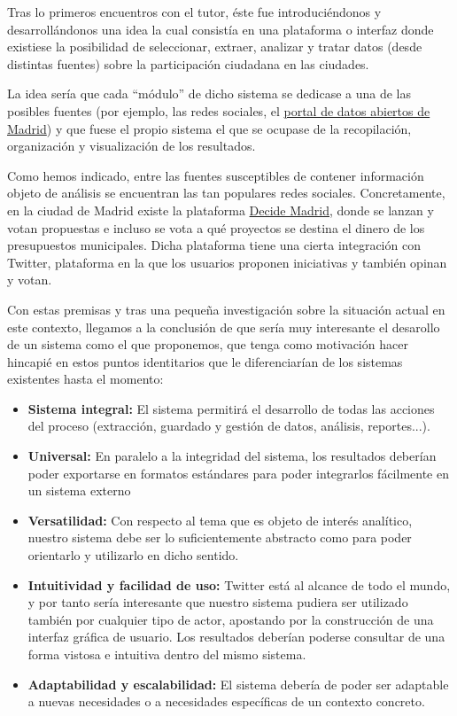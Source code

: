Tras lo primeros encuentros con el tutor, éste fue introduciéndonos y desarrollándonos una idea la cual consistía en una plataforma o interfaz donde existiese la posibilidad de seleccionar, extraer, analizar y tratar datos (desde distintas fuentes) sobre la participación ciudadana en las ciudades.

La idea sería que cada ``módulo'' de dicho sistema se dedicase a una de las posibles fuentes (por ejemplo, las redes sociales, el \href{https://datos.madrid.es/portal/site/egob/}{portal de datos abiertos de Madrid}) y que fuese el propio sistema el que se ocupase de la recopilación, organización y visualización de los resultados.

Como hemos indicado, entre las fuentes susceptibles de contener información objeto de análisis se encuentran las tan populares redes sociales. Concretamente, en la ciudad de Madrid existe la plataforma \href{https://decide.madrid.es/}{Decide Madrid}, donde se lanzan y votan propuestas e incluso se vota a qué proyectos se destina el dinero de los presupuestos municipales. Dicha plataforma tiene una cierta integración con Twitter, plataforma en la que los usuarios proponen iniciativas y también opinan y votan.

Con estas premisas y tras una pequeña investigación sobre la situación actual en este contexto, llegamos a la conclusión de que sería muy interesante el desarollo de un sistema como el que proponemos, que tenga como motivación hacer hincapié en estos puntos identitarios que le diferenciarían de los sistemas existentes hasta el momento:
\newpage
\begin{itemize}
	\item \textbf{Sistema integral:} El sistema permitirá el desarrollo de todas las acciones del proceso (extracción, guardado y gestión de datos, análisis, reportes...). 
	\item \textbf{Universal:} En paralelo a la integridad del sistema, los resultados deberían poder exportarse en formatos estándares para poder integrarlos fácilmente en un sistema externo
	\item \textbf{Versatilidad:} Con respecto al tema que es objeto de interés analítico, nuestro sistema debe ser lo suficientemente abstracto como para poder orientarlo y utilizarlo en dicho sentido.
	\item \textbf{Intuitividad y facilidad de uso:} Twitter está al alcance de todo el mundo, y por tanto sería interesante que nuestro sistema pudiera ser utilizado también por cualquier tipo de actor, apostando por la construcción de una interfaz gráfica de usuario. Los resultados deberían poderse consultar de una forma vistosa e intuitiva dentro del mismo sistema.
	\item \textbf{Adaptabilidad y escalabilidad:} El sistema debería de poder ser adaptable a nuevas necesidades o a necesidades específicas de un contexto concreto. 
\end{itemize}

